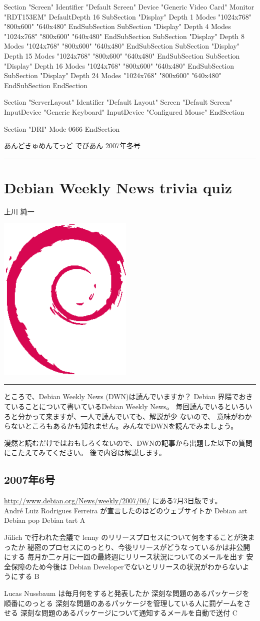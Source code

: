 \documentclass[mingoth,a4paper]{jsarticle}
\renewcommand{\dancersection}[2]{%
\newpage
あんどきゅめんてっど でびあん 2007年冬号
%
\vspace{0.1mm}\\
{\color{dancerlightblue}\rule{\hsize}{2mm}}

%
%
\begin{minipage}[t]{0.7\hsize}
\color{dancerdarkblue}
\vspace{1cm}
\section{#1}
\hfill{}#2\\
\end{minipage}
\begin{minipage}[t]{0.3\hsize}
\vspace{-2cm}
\hfill{}\includegraphics[height=8cm]{image200502/openlogo-nd.eps}\\
\vspace{-5cm}
\end{minipage}
%
%
{\color{dancerdarkblue}\rule{0.74\hsize}{2mm}}
%
\vspace{2cm}
}
\begin{document}
\begin{commandline}
Section "Screen"
	Identifier	"Default Screen"
	Device		"Generic Video Card"
	Monitor		"RDT153EM"
	DefaultDepth	16
	SubSection "Display"
		Depth		1
		Modes		"1024x768" "800x600" "640x480"
	EndSubSection
	SubSection "Display"
		Depth		4
		Modes		"1024x768" "800x600" "640x480"
	EndSubSection
	SubSection "Display"
		Depth		8
		Modes		"1024x768" "800x600" "640x480"
	EndSubSection
	SubSection "Display"
		Depth		15
		Modes		"1024x768" "800x600" "640x480"
	EndSubSection
	SubSection "Display"
		Depth		16
		Modes		"1024x768" "800x600" "640x480"
	EndSubSection
	SubSection "Display"
		Depth		24
		Modes		"1024x768" "800x600" "640x480"
	EndSubSection
EndSection

Section "ServerLayout"
	Identifier	"Default Layout"
	Screen		"Default Screen"
	InputDevice	"Generic Keyboard"
	InputDevice	"Configured Mouse"
EndSection

Section "DRI"
	Mode	0666
EndSection
\end{commandline}

\dancersection{Debian Weekly News trivia quiz}{上川 純一}

ところで、Debian Weekly News (DWN)は読んでいますか？
Debian 界隈でおきていることについて書いているDebian Weekly News。
毎回読んでいるといろいろと分かって来ますが、一人で読んでいても、解説が少
ないので、
意味がわからないところもあるかも知れません。みんなでDWNを読んでみましょう。

漫然と読むだけではおもしろくないので、DWNの記事から出題した以下の質問にこたえてみてください。
後で内容は解説します。

\subsection{2007年6号}
\url{http://www.debian.org/News/weekly/2007/06/}
にある7月3日版です。\\

\santaku
{Andr\'e Luiz Rodrigues Ferreira が宣言したのはどのウェブサイトか}
{Debian art}
{Debian pop}
{Debian tart}
{A}

\santaku
{J\"ulich で行われた会議で lenny のリリースプロセスについて何をすることが決まったか}
{秘密のプロセスにのっとり、今後リリースがどうなっているかは非公開にする}
{毎月か二ヶ月に一回の最終週にリリース状況についてのメールを出す}
{安全保障のため今後は Debian Developerでないとリリースの状況がわからないようにする}
{B}

\santaku
{Lucas Nussbaum は毎月何をすると発表したか}
{深刻な問題のあるパッケージを順番にのっとる}
{深刻な問題のあるパッケージを管理している人に罰ゲームをさせる}
{深刻な問題のあるパッケージについて通知するメールを自動で送付}
{C}
\end{document}
